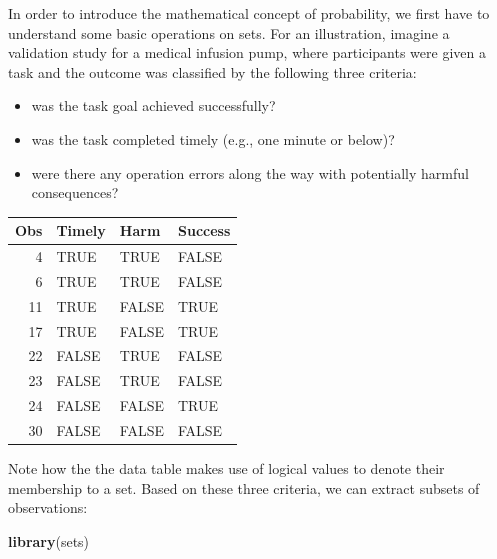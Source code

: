 \documentclass[]{svmono}
\newenvironment{Shaded}{\begin{snugshade}}{\end{snugshade}}
\newcommand{\KeywordTok}[1]{\textcolor[rgb]{0.13,0.29,0.53}{\textbf{#1}}}
\newcommand{\StringTok}[1]{\textcolor[rgb]{0.31,0.60,0.02}{#1}}
\newcommand{\OperatorTok}[1]{\textcolor[rgb]{0.81,0.36,0.00}{\textbf{#1}}}
\newcommand{\NormalTok}[1]{#1}
\providecommand{\tightlist}{%
  \setlength{\itemsep}{0pt}\setlength{\parskip}{0pt}}
\theoremstyle{definition}
\theoremstyle{definition}
\theoremstyle{definition}
\theoremstyle{remark}
\begin{document}
In order to introduce the mathematical concept of probability, we first
have to understand some basic operations on sets. For an illustration,
imagine a validation study for a medical infusion pump, where
participants were given a task and the outcome was classified by the
following three criteria:

\begin{itemize}
\tightlist
\item
  was the task goal achieved successfully?
\item
  was the task completed timely (e.g., one minute or below)?
\item
  were there any operation errors along the way with potentially harmful
  consequences?
\end{itemize}

\begin{longtable}[]{@{}rlll@{}}
\toprule
Obs & Timely & Harm & Success\tabularnewline
\midrule
\endhead
4 & TRUE & TRUE & FALSE\tabularnewline
6 & TRUE & TRUE & FALSE\tabularnewline
11 & TRUE & FALSE & TRUE\tabularnewline
17 & TRUE & FALSE & TRUE\tabularnewline
22 & FALSE & TRUE & FALSE\tabularnewline
23 & FALSE & TRUE & FALSE\tabularnewline
24 & FALSE & FALSE & TRUE\tabularnewline
30 & FALSE & FALSE & FALSE\tabularnewline
\bottomrule
\end{longtable}

Note how the the data table makes use of logical values to denote their
membership to a set. Based on these three criteria, we can extract
subsets of observations:

\begin{Shaded}
\begin{Highlighting}[]
\KeywordTok{library}\NormalTok{(sets)}
\end{Highlighting}
\end{Shaded}

\begin{Shaded}
\end{Shaded}
\end{document}
